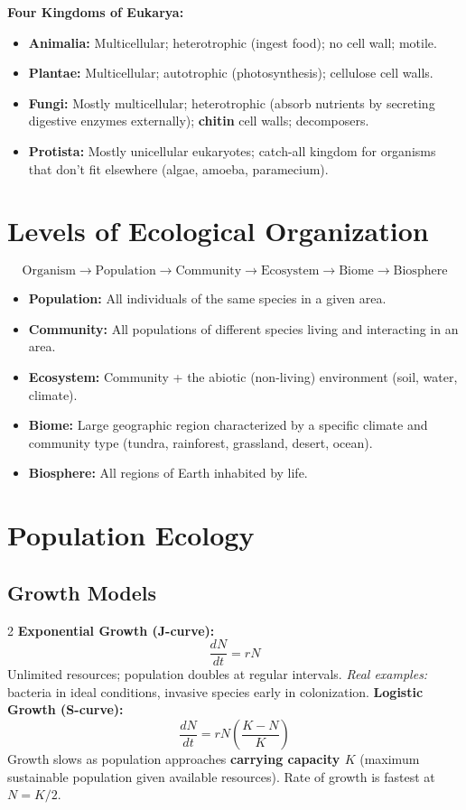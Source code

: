 \documentclass[11pt, letterpaper]{article}
\begin{document}
\textbf{Four Kingdoms of Eukarya:}
\begin{itemize}[noitemsep]
  \item \textbf{Animalia:} Multicellular; heterotrophic (ingest food); no cell wall; motile.
  \item \textbf{Plantae:} Multicellular; autotrophic (photosynthesis); cellulose cell walls.
  \item \textbf{Fungi:} Mostly multicellular; heterotrophic (absorb nutrients by secreting
        digestive enzymes externally); \textbf{chitin} cell walls; decomposers.
  \item \textbf{Protista:} Mostly unicellular eukaryotes; catch-all kingdom for organisms
        that don't fit elsewhere (algae, amoeba, paramecium).
\end{itemize}

\section*{Levels of Ecological Organization}

\[
  \text{Organism} \to \text{Population} \to \text{Community} \to
  \text{Ecosystem} \to \text{Biome} \to \text{Biosphere}
\]
\begin{itemize}[noitemsep]
  \item \textbf{Population:} All individuals of the same species in a given area.
  \item \textbf{Community:} All populations of different species living and interacting in
        an area.
  \item \textbf{Ecosystem:} Community + the abiotic (non-living) environment (soil, water, climate).
  \item \textbf{Biome:} Large geographic region characterized by a specific climate and
        community type (tundra, rainforest, grassland, desert, ocean).
  \item \textbf{Biosphere:} All regions of Earth inhabited by life.
\end{itemize}

\section*{Population Ecology}

\subsection*{Growth Models}

\begin{tcolorbox}[colback=partbg, colframe=sectionblue, arc=3pt, boxrule=1pt]
\begin{multicols}{2}
\textbf{Exponential Growth (J-curve):}
\[\frac{dN}{dt} = rN\]
Unlimited resources; population doubles at regular intervals.
\textit{Real examples:} bacteria in ideal conditions, invasive species early in colonization.
\columnbreak
\textbf{Logistic Growth (S-curve):}
\[\frac{dN}{dt} = rN\left(\frac{K-N}{K}\right)\]
Growth slows as population approaches \textbf{carrying capacity $K$} (maximum sustainable population given available resources). Rate of growth is fastest at $N = K/2$.
\end{multicols}
\end{tcolorbox}
\end{document}
